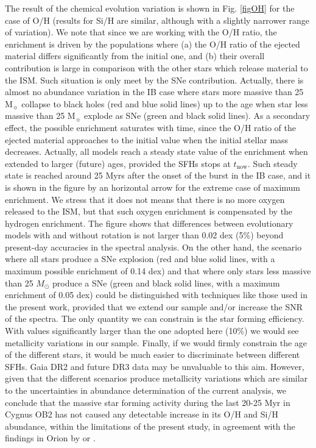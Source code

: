 \documentclass{aa} %
\begin{document}
The result of the chemical evolution variation is shown in Fig. \ref{figOH} for the case of O/H (results for Si/H are similar, although with a slightly narrower range of variation). We note that since we are working with the O/H ratio, the enrichment is driven by the populations where (a) the O/H ratio of the ejected material differs significantly from the initial one, and (b) their overall contribution is large in comparison with the other stars which release material to the ISM. Such situation is only meet by the SNe contribution. Actually, there is almost no abundance variation in the IB case where stars more massive than 25 $\mathrm{M}_\sun$ collapse to black holes (red and blue solid lines) up to the age when star less massive than 25 $\mathrm{M}_\sun$ explode as SNe (green and black solid lines). As a secondary effect, the possible enrichment saturates with time, since the O/H ratio of the ejected material approaches to the initial value when the initial stellar mass decreases. Actually, all models reach a steady state value of the enrichment when extended to larger (future) ages, provided the SFHs stops at $t_\mathrm{now}$. Such steady state is reached around 25 Myrs after the onset of the burst in the IB case, and it is shown in the figure by an horizontal arrow for the extreme case of maximum enrichment. We stress that it does not means that there is no more oxygen released to the ISM, but that such oxygen enrichment is compensated by the hydrogen enrichment. The figure shows that differences between evolutionary models with and without rotation is not larger than 0.02 dex (5\%) beyond present-day accuracies in the spectral analysis. On the other hand, the scenario where all stars produce a SNe explosion (red and blue solid lines, with a maximum possible enrichment of 0.14 dex)  and that where only stars less massive than 25 $M_{\odot}$ produce a SNe (green and black solid lines, with a maximum enrichment of 0.05 dex) could be distinguished with techniques like those used in the present work, provided that we extend our sample and/or increase the SNR of the spectra. The only quantity we can constrain is the star forming efficiency. With values significantly larger than the one adopted here (10$\%$) we would see metallicity variations in our sample. Finally, if we would  firmly constrain the age of the different stars, it would be much easier to discriminate between different SFHs. Gaia DR2 and future DR3 data may be unvaluable to this aim. However, given that the different scenarios produce metallicity variations which are similar to the uncertainties in abundance determination of the current analysis, we conclude that the massive star forming activity during the last 20-25 Myr in Cygnus OB2 has not caused any detectable increase in its O/H and Si/H abundance,
within the limitations of the present study, in agreement with the findings in Orion by \cite{ssimon10} or  \cite{biazzo11a}.
\end{document}
